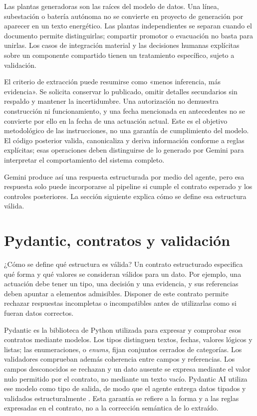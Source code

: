 Las plantas generadoras son las raíces del modelo de datos. Una línea,
subestación o batería autónoma no se convierte en proyecto de generación por
aparecer en un texto energético. Las plantas independientes se separan cuando
el documento permite distinguirlas; compartir promotor o evacuación no basta
para unirlas. Los casos de integración material y las decisiones humanas
explícitas sobre un componente compartido tienen un tratamiento específico,
sujeto a validación.

El criterio de extracción puede resumirse como «menos inferencia, más
evidencia». Se solicita conservar lo publicado, omitir detalles secundarios
sin respaldo y mantener la incertidumbre. Una autorización no demuestra
construcción ni funcionamiento, y una fecha mencionada en antecedentes no
se convierte por ello en la fecha de una actuación actual. Este es el objetivo
metodológico de las instrucciones, no una garantía de cumplimiento del modelo.
El código posterior valida, canonicaliza y deriva información conforme a
reglas explícitas; esas operaciones deben distinguirse de lo generado por
Gemini para interpretar el comportamiento del sistema completo.

Gemini produce así una respuesta estructurada por medio del agente, pero esa
respuesta solo puede incorporarse al pipeline si cumple el contrato esperado
y los controles posteriores. La sección siguiente explica cómo se define esa
estructura válida.

\section{Pydantic, contratos y validación}
\label{sec:contratos-validacion}
¿Cómo se define qué estructura es válida? Un contrato estructurado especifica
qué forma y qué valores se consideran
válidos para un dato. Por ejemplo, una actuación debe tener un tipo, una
decisión y una evidencia, y sus referencias deben apuntar a elementos
admisibles. Disponer de este contrato permite rechazar respuestas incompletas
o incompatibles antes de utilizarlas como si fueran datos correctos.

Pydantic es la biblioteca de Python utilizada para expresar y comprobar esos
contratos mediante modelos. Los tipos distinguen textos, fechas, valores
lógicos y listas; las enumeraciones, o \emph{enums}, fijan conjuntos cerrados
de categorías. Los validadores comprueban además coherencia entre campos y
referencias. Los campos desconocidos se rechazan y un dato ausente se expresa
mediante el valor nulo permitido por el contrato, no mediante un texto vacío.
Pydantic AI utiliza ese modelo como tipo de salida, de modo que el agente
entrega datos tipados y validados estructuralmente
\cite{pydantic_ai_overview_2026}. Esta garantía se refiere a la forma y a las
reglas expresadas en el contrato, no a la corrección semántica de lo extraído.


